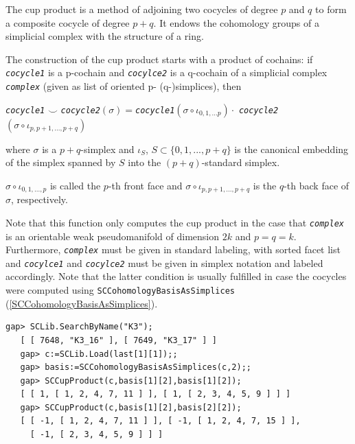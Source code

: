 \documentclass[a4paper,11pt]{report}
\begin{document}
{{{ The cup product is a method of adjoining two cocycles of degree $p$ and $q$ to form a composite cocycle of degree $p + q$. It endows the cohomology groups of a simplicial complex with the structure
of a ring. 

 The construction of the cup product starts with a product of cochains: if \mbox{\texttt{\mdseries\slshape cocycle1}} is a p-cochain and \mbox{\texttt{\mdseries\slshape cocylce2}} is a q-cochain of a simplicial complex \mbox{\texttt{\mdseries\slshape complex}} (given as list of oriented p- (q-)simplices), then

 \mbox{\texttt{\mdseries\slshape cocycle1}} $\smile$ \mbox{\texttt{\mdseries\slshape cocycle2}}$(\sigma) = $\mbox{\texttt{\mdseries\slshape cocycle1}}$(\sigma \circ \iota_{0,1, ... p}) \cdot$ \mbox{\texttt{\mdseries\slshape cocycle2}}$(\sigma \circ \iota_{p, p+1 ,..., p + q})$

 where $\sigma$ is a $p + q$-simplex and $\iota_S$, $S \subset \{0,1,...,p+q \}$ is the canonical embedding of the simplex spanned by $S$ into the $(p + q)$-standard simplex.

 $\sigma \circ \iota_{0,1, ..., p}$ is called the $p$-th front face and $\sigma \circ \iota_{p, p+1, ..., p + q}$ is the $q$-th back face of $\sigma$, respectively.

 Note that this function only computes the cup product in the case that \mbox{\texttt{\mdseries\slshape complex}} is an orientable weak pseudomanifold of dimension $2k$ and $p = q = k$. Furthermore, \mbox{\texttt{\mdseries\slshape complex}} must be given in standard labeling, with sorted facet list and \mbox{\texttt{\mdseries\slshape cocylce1}} and \mbox{\texttt{\mdseries\slshape cocylce2}} must be given in simplex notation and labeled accordingly. Note that the
latter condition is usually fulfilled in case the cocycles were computed using \texttt{SCCohomologyBasisAsSimplices} (\ref{SCCohomologyBasisAsSimplices}). 
\begin{Verbatim}[commandchars=!@|,fontsize=\small,frame=single,label=Example]
   gap> SCLib.SearchByName("K3");
   [ [ 7648, "K3_16" ], [ 7649, "K3_17" ] ]
   gap> c:=SCLib.Load(last[1][1]);;                                     
   gap> basis:=SCCohomologyBasisAsSimplices(c,2);;
   gap> SCCupProduct(c,basis[1][2],basis[1][2]);
   [ [ 1, [ 1, 2, 4, 7, 11 ] ], [ 1, [ 2, 3, 4, 5, 9 ] ] ]
   gap> SCCupProduct(c,basis[1][2],basis[2][2]);
   [ [ -1, [ 1, 2, 4, 7, 11 ] ], [ -1, [ 1, 2, 4, 7, 15 ] ], 
     [ -1, [ 2, 3, 4, 5, 9 ] ] ]
   
\end{Verbatim}
 }

}}
\end{document}
